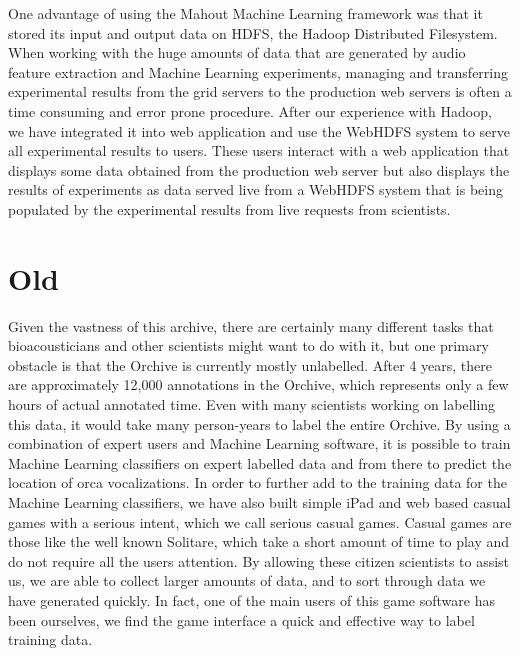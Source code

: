 One advantage of using the Mahout Machine Learning framework was that
it stored its input and output data on HDFS, the Hadoop Distributed
Filesystem.  When working with the huge amounts of data that are
generated by audio feature extraction and Machine Learning
experiments, managing and transferring experimental results from the
grid servers to the production web servers is often a time consuming
and error prone procedure.  After our experience with Hadoop, we have
integrated it into web application and use the WebHDFS system to serve
all experimental results to users.  These users interact with a web
application that displays some data obtained from the production web
server but also displays the results of experiments as data served
live from a WebHDFS system that is being populated by the experimental
results from live requests from scientists.












\section{Old}



Given the vastness of this archive, there are certainly many different
tasks that bioacousticians and other scientists might want to do with
it, but one primary obstacle is that the Orchive is currently mostly
unlabelled.  After 4 years, there are approximately 12,000 annotations
in the Orchive, which represents only a few hours of actual annotated
time.  Even with many scientists working on labelling this data, it
would take many person-years to label the entire Orchive.  By using a
combination of expert users and Machine Learning software, it is
possible to train Machine Learning classifiers on expert labelled data
and from there to predict the location of orca vocalizations.   In
order to further add to the training data for the Machine Learning
classifiers, we have also built simple iPad and web based casual games
with a serious intent, which we call serious casual games.  Casual
games are those like the well known Solitare, which take a short
amount of time to play and do not require all the users attention.  By
allowing these citizen scientists to assist us, we are able to
collect larger amounts of data, and to sort through data we have
generated quickly.  In fact, one of the main users of this game
software has been ourselves, we find the game interface a quick and
effective way to label training data.  

